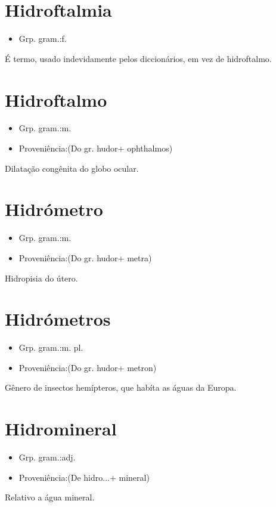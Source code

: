 \documentclass{article}
\begin{document}
\section{Hidroftalmia}
\begin{itemize}
\item {Grp. gram.:f.}
\end{itemize}
É termo, usado indevidamente pelos diccionários, em vez de \textunderscore hidroftalmo\textunderscore .
\section{Hidroftalmo}
\begin{itemize}
\item {Grp. gram.:m.}
\end{itemize}
\begin{itemize}
\item {Proveniência:(Do gr. \textunderscore hudor\textunderscore  + \textunderscore ophthalmos\textunderscore )}
\end{itemize}
Dilatação congênita do globo ocular.
\section{Hidrómetro}
\begin{itemize}
\item {Grp. gram.:m.}
\end{itemize}
\begin{itemize}
\item {Proveniência:(Do gr. \textunderscore hudor\textunderscore  + \textunderscore metra\textunderscore )}
\end{itemize}
Hidropisia do útero.
\section{Hidrómetros}
\begin{itemize}
\item {Grp. gram.:m. pl.}
\end{itemize}
\begin{itemize}
\item {Proveniência:(Do gr. \textunderscore hudor\textunderscore  + \textunderscore metron\textunderscore )}
\end{itemize}
Gênero de insectos hemípteros, que habíta as águas da Europa.
\section{Hidromineral}
\begin{itemize}
\item {Grp. gram.:adj.}
\end{itemize}
\begin{itemize}
\item {Proveniência:(De \textunderscore hidro...\textunderscore  + \textunderscore mineral\textunderscore )}
\end{itemize}
Relativo a água mineral.
\end{document}
